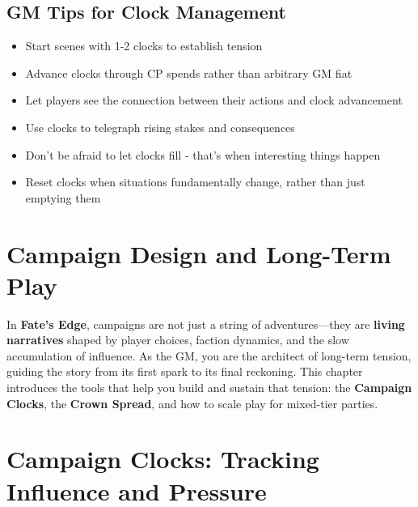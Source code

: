 \subsection*{GM Tips for Clock Management}

\begin{itemize}[leftmargin=*]
\item Start scenes with 1-2 clocks to establish tension
\item Advance clocks through CP spends rather than arbitrary GM fiat
\item Let players see the connection between their actions and clock advancement
\item Use clocks to telegraph rising stakes and consequences
\item Don't be afraid to let clocks fill - that's when interesting things happen
\item Reset clocks when situations fundamentally change, rather than just emptying them
\end{itemize}



\section{Campaign Design and Long-Term Play}

In \textbf{Fate's Edge}, campaigns are not just a string of adventures—they are \textbf{living narratives} shaped by player choices, faction dynamics, and the slow accumulation of influence. As the GM, you are the architect of long-term tension, guiding the story from its first spark to its final reckoning. This chapter introduces the tools that help you build and sustain that tension: the \textbf{Campaign Clocks}, the \textbf{Crown Spread}, and how to scale play for mixed-tier parties.

\section*{Campaign Clocks: Tracking Influence and Pressure}

